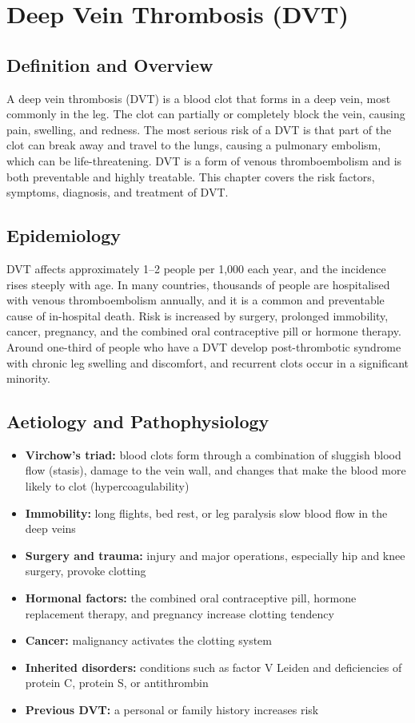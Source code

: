 \chapter{Deep Vein Thrombosis (DVT)}

\section*{Definition and Overview}
A deep vein thrombosis (DVT) is a blood clot that forms in a deep vein, most commonly in the leg. The clot can partially or completely block the vein, causing pain, swelling, and redness. The most serious risk of a DVT is that part of the clot can break away and travel to the lungs, causing a pulmonary embolism, which can be life-threatening. DVT is a form of venous thromboembolism and is both preventable and highly treatable. This chapter covers the risk factors, symptoms, diagnosis, and treatment of DVT.

\section*{Epidemiology}
DVT affects approximately 1--2 people per 1,000 each year, and the incidence rises steeply with age. In many countries, thousands of people are hospitalised with venous thromboembolism annually, and it is a common and preventable cause of in-hospital death. Risk is increased by surgery, prolonged immobility, cancer, pregnancy, and the combined oral contraceptive pill or hormone therapy. Around one-third of people who have a DVT develop post-thrombotic syndrome with chronic leg swelling and discomfort, and recurrent clots occur in a significant minority.

\section*{Aetiology and Pathophysiology}
\begin{itemize}
    \item \textbf{Virchow's triad:} blood clots form through a combination of sluggish blood flow (stasis), damage to the vein wall, and changes that make the blood more likely to clot (hypercoagulability)
    \item \textbf{Immobility:} long flights, bed rest, or leg paralysis slow blood flow in the deep veins
    \item \textbf{Surgery and trauma:} injury and major operations, especially hip and knee surgery, provoke clotting
    \item \textbf{Hormonal factors:} the combined oral contraceptive pill, hormone replacement therapy, and pregnancy increase clotting tendency
    \item \textbf{Cancer:} malignancy activates the clotting system
    \item \textbf{Inherited disorders:} conditions such as factor V Leiden and deficiencies of protein C, protein S, or antithrombin
    \item \textbf{Previous DVT:} a personal or family history increases risk
\end{itemize}

